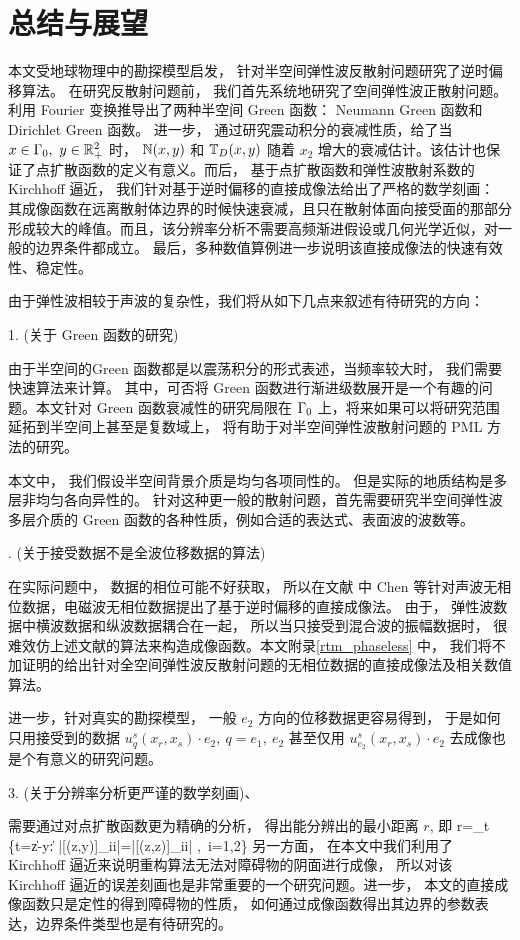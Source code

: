 \chapter{总结与展望} \label{chap:summary}

本文受地球物理中的勘探模型启发， 针对半空间弹性波反散射问题研究了逆时偏移算法。 在研究反散射问题前， 我们首先系统地研究了空间弹性波正散射问题。利用 Fourier 变换推导出了两种半空间 Green 函数： Neumann Green 函数和 Dirichlet Green 函数。 进一步， 通过研究震动积分的衰减性质，给了当 $x\in \Gamma_0, \ y\in \mathbb{R}^2_+$ 时， $\mathbb{N}(x,y)$ 和 $\mathbb{T}_D(x,y)$ 随着 $x_2$ 增大的衰减估计。该估计也保证了点扩散函数的定义有意义。而后， 基于点扩散函数和弹性波散射系数的 Kirchhoff 逼近， 我们针对基于逆时偏移的直接成像法给出了严格的数学刻画： 其成像函数在远离散射体边界的时候快速衰减，且只在散射体面向接受面的那部分形成较大的峰值。而且，该分辨率分析不需要高频渐进假设或几何光学近似，对一般的边界条件都成立。 最后，多种数值算例进一步说明该直接成像法的快速有效性、稳定性。

由于弹性波相较于声波的复杂性，我们将从如下几点来叙述有待研究的方向：

1. (关于 Green 函数的研究)

由于半空间的Green 函数都是以震荡积分的形式表述，当频率较大时， 我们需要快速算法来计算。 其中，可否将 Green 函数进行渐进级数展开是一个有趣的问题。本文针对 Green 函数衰减性的研究局限在 $\Gamma_0$ 上，将来如果可以将研究范围延拓到半空间上甚至是复数域上， 将有助于对半空间弹性波散射问题的 PML 方法的研究。

 本文中， 我们假设半空间背景介质是均匀各项同性的。 但是实际的地质结构是多层非均匀各向异性的。 针对这种更一般的散射问题，首先需要研究半空间弹性波多层介质的 Green 函数的各种性质，例如合适的表达式、表面波的波数等。 

. (关于接受数据不是全波位移数据的算法)

在实际问题中， 数据的相位可能不好获取， 所以在文献 \cite{chen2016direct,chen2017direct,chen2017phaseless} 中 Chen 等针对声波无相位数据，电磁波无相位数据提出了基于逆时偏移的直接成像法。 由于， 弹性波数据中横波数据和纵波数据耦合在一起， 所以当只接受到混合波的振幅数据时， 很难效仿上述文献的算法来构造成像函数。本文附录\ref{rtm_phaseless} 中， 我们将不加证明的给出针对全空间弹性波反散射问题的无相位数据的直接成像法及相关数值算法。

进一步，针对真实的勘探模型， 一般 $e_2$ 方向的位移数据更容易得到， 于是如何只用接受到的数据 $u^s_q(x_r,x_s)\cdot e_2, \ q=e_1, \ e_2$ 甚至仅用 $u^s_{e_2}(x_r,x_s)\cdot e_2$ 去成像也是个有意义的研究问题。

\bigskip

3. (关于分辨率分析更严谨的数学刻画)、

需要通过对点扩散函数更为精确的分析， 得出能分辨出的最小距离 $r$, 即
\ben
r=\inf_{t} \{t=\|z-y\| : |[\J(z,y)]_{ii}|=|[\J(z,z)]_{ii}| ,\ i=1,2\}
\een
另一方面， 在本文中我们利用了 Kirchhoff 逼近来说明重构算法无法对障碍物的阴面进行成像， 所以对该 Kirchhoff 逼近的误差刻画也是非常重要的一个研究问题。进一步， 本文的直接成像函数只是定性的得到障碍物的性质， 如何通过成像函数得出其边界的参数表达，边界条件类型也是有待研究的。
